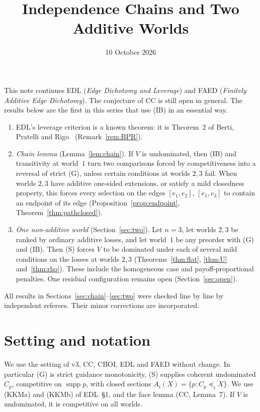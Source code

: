 \documentclass[11pt]{article}
\title{Independence Chains and Two Additive Worlds}
\author{}\date{10 October 2026}
\theoremstyle{definition}\newtheorem{definition}[theorem]{Definition}
\theoremstyle{remark}\newtheorem{remark}[theorem]{Remark}
\newcommand{\supp}{\operatorname{supp}}
\begin{document}
\maketitle

\noindent
This note continues EDL (\emph{Edge Dichotomy and Leverage}) and FAED
(\emph{Finitely Additive Edge Dichotomy}). The conjecture of CC is still open
in general. The results below are the first in this series that use (IB) in
an essential way.
\begin{enumerate}[leftmargin=*,itemsep=2pt]
\item EDL's leverage criterion is a known theorem: it is Theorem~2 of Berti,
Pratelli and Rigo~\cite{BPR} (Remark~\ref{rem:BPR}).
\item \emph{Chain lemma} (Lemma~\ref{lem:chain}). If $V$ is undominated, then
(IB) and transitivity at world~$1$ turn two comparisons forced by
competitiveness into a reversal of strict (G), unless certain conditions at
worlds $2,3$ fail. When worlds $2,3$ have additive one-sided extensions, or
satisfy a mild closedness property, this forces every selection on the edges
$[e_1,e_2]$, $[e_1,e_3]$ to contain an endpoint of its edge
(Proposition~\ref{prop:endpoint}, Theorem~\ref{thm:pathclosed}).
\item \emph{One non-additive world} (Section~\ref{sec:two}). Let $n=3$, let
worlds $2,3$ be ranked by ordinary additive losses, and let world~$1$ be any
preorder with (G) and (IB). Then (S) forces $V$ to be dominated under each of
several mild conditions on the losses at worlds $2,3$
(Theorems~\ref{thm:flat}, \ref{thm:U} and~\ref{thm:rho}). These include the
homogeneous case and payoff-proportional penalties. One residual configuration
remains open (Section~\ref{sec:open}).
\end{enumerate}
All results in Sections~\ref{sec:chain}--\ref{sec:two} were checked line by
line by independent referees. Their minor corrections are incorporated.

\section{Setting and notation}\label{sec:setting}

We use the setting of v3, CC, CBOI, EDL and FAED without change. In
particular (G) is strict guidance monotonicity, (S) supplies coherent
undominated $C_p$, competitive on $\supp p$, with closed sections
$A_i(X)=\{p:C_p\preceq_iX\}$. We use (KKMa) and (KKMb) of EDL~\S1, and the
face lemma (CC, Lemma~7). If $V$ is undominated, it is competitive on all
worlds.
\end{document}
